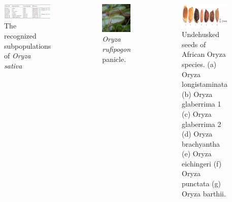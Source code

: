 \documentclass[
  ignorenonframetext,
  aspectratio=169]{beamer}
\newcommand{\bcolumns}{\begin{columns}[T, onlytextwidth]}
\newcommand{\ecolumns}{\end{columns}}
\begin{document}
\begin{frame}{}
\protect\hypertarget{section-8}{}
\bcolumns
{}

\begin{figure}
\includegraphics[width=0.94\linewidth]{./../images/rice_subpopulations} \caption{The recognized subpopulations of \textit{Oryza sativa}}\label{fig:subpopulations-rice}
\end{figure}


\begin{figure}
\includegraphics[width=0.5\linewidth]{../images/oryza rufipogon} \caption{\textit{Oryza rufipogon} panicle.}\label{fig:oryza-rufipogon}
\end{figure}

\begin{figure}
\includegraphics[width=0.6\linewidth]{../images/undehusked_rice_types} \caption{Undehusked seeds of African Oryza species. (a) Oryza longistaminata (b) Oryza glaberrima 1 (c) Oryza glaberrima 2 (d) Oryza brachyantha (e) Oryza eichingeri (f) Oryza punctata (g) Oryza barthii.}\label{fig:oryza-rice-types-seed}
\end{figure}

\ecolumns
\end{frame}
\end{document}
